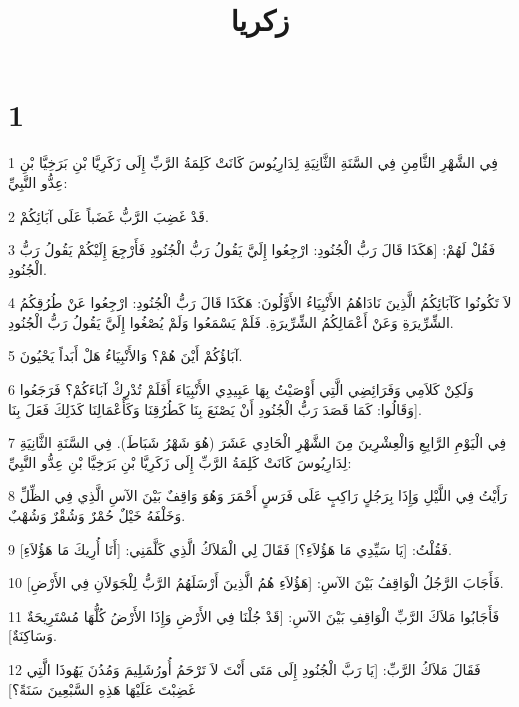 

\title{زكريا}


\chapter{1}

\par 1 فِي الشَّهْرِ الثَّامِنِ فِي السَّنَةِ الثَّانِيَةِ لِدَارِيُوسَ كَانَتْ كَلِمَةُ الرَّبِّ إِلَى زَكَرِيَّا بْنِ بَرَخِيَّا بْنِ عِدُّو النَّبِيِّ:
\par 2 قَدْ غَضِبَ الرَّبُّ غَضَباً عَلَى آبَائِكُمْ.
\par 3 فَقُلْ لَهُمْ: [هَكَذَا قَالَ رَبُّ الْجُنُودِ: ارْجِعُوا إِلَيَّ يَقُولُ رَبُّ الْجُنُودِ فَأَرْجِعَ إِلَيْكُمْ يَقُولُ رَبُّ الْجُنُودِ.
\par 4 لاَ تَكُونُوا كَآبَائِكُمُ الَّذِينَ نَادَاهُمُ الأَنْبِيَاءُ الأَوَّلُونَ: هَكَذَا قَالَ رَبُّ الْجُنُودِ: ارْجِعُوا عَنْ طُرُقِكُمُ الشِّرِّيرَةِ وَعَنْ أَعْمَالِكُمُ الشِّرِّيرَةِ. فَلَمْ يَسْمَعُوا وَلَمْ يُصْغُوا إِلَيَّ يَقُولُ رَبُّ الْجُنُودِ.
\par 5 آبَاؤُكُمْ أَيْنَ هُمْ؟ وَالأَنْبِيَاءُ هَلْ أَبَداً يَحْيُونَ.
\par 6 وَلَكِنْ كَلاَمِي وَفَرَائِضِي الَّتِي أَوْصَيْتُ بِهَا عَبِيدِي الأَنْبِيَاءَ أَفَلَمْ تُدْرِكْ آبَاءَكُمْ؟ فَرَجَعُوا وَقَالُوا: كَمَا قَصَدَ رَبُّ الْجُنُودِ أَنْ يَصْنَعَ بِنَا كَطُرُقِنَا وَكَأَعْمَالِنَا كَذَلِكَ فَعَلَ بِنَا].
\par 7 فِي الْيَوْمِ الرَّابِعِ وَالْعِشْرِينَ مِنَ الشَّهْرِ الْحَادِي عَشَرَ (هُوَ شَهْرُ شَبَاطَ). فِي السَّنَةِ الثَّانِيَةِ لِدَارِيُوسَ كَانَتْ كَلِمَةُ الرَّبِّ إِلَى زَكَرِيَّا بْنِ بَرَخِيَّا بْنِ عِدُّو النَّبِيِّ:
\par 8 رَأَيْتُ فِي اللَّيْلِ وَإِذَا بِرَجُلٍ رَاكِبٍ عَلَى فَرَسٍ أَحْمَرَ وَهُوَ وَاقِفٌ بَيْنَ الآسِ الَّذِي فِي الظِّلِّ وَخَلْفَهُ خَيْلٌ حُمْرٌ وَشُقْرٌ وَشُهْبٌ.
\par 9 فَقُلْتُ: [يَا سَيِّدِي مَا هَؤُلاَءِ؟] فَقَالَ لِي الْمَلاَكُ الَّذِي كَلَّمَنِي: [أَنَا أُرِيكَ مَا هَؤُلاَءِ].
\par 10 فَأَجَابَ الرَّجُلُ الْوَاقِفُ بَيْنَ الآسِ: [هَؤُلاَءِ هُمُ الَّذِينَ أَرْسَلَهُمُ الرَّبُّ لِلْجَوَلاَنِ فِي الأَرْضِ].
\par 11 فَأَجَابُوا مَلاَكَ الرَّبِّ الْوَاقِفِ بَيْنَ الآسِ: [قَدْ جُلْنَا فِي الأَرْضِ وَإِذَا الأَرْضُ كُلُّهَا مُسْتَرِيحَةٌ وَسَاكِنَةٌ].
\par 12 فَقَالَ مَلاَكُ الرَّبِّ: [يَا رَبَّ الْجُنُودِ إِلَى مَتَى أَنْتَ لاَ تَرْحَمُ أُورُشَلِيمَ وَمُدُنَ يَهُوذَا الَّتِي غَضِبْتَ عَلَيْهَا هَذِهِ السَّبْعِينَ سَنَةً؟]
